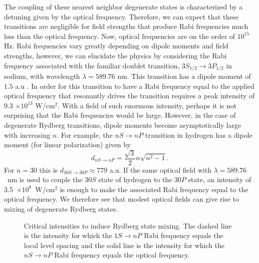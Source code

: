 The coupling of these nearest neighbor degenerate states is characterized by
a detuning given by the optical frequency.  Therefore, we can expect that
these transitions are negligible for field strengths that produce Rabi
frequencies much less than the optical frequency.  Now, optical frequencies
are on the order of $10^{15}$ Hz.  Rabi frequencies vary greatly depending
on dipole moments and field strengths, however, we can elucidate the physics
by considering the Rabi frequency associated with the familiar doublet
transition, $3S_{1/2} \rightarrow 3P_{1/2}$ in sodium, with wavelength
$\lambda = 589.76$ nm.  This transition has a dipole moment of $1.5$ a.u
\cite{Wiese:69}.  In order for this transition to have a Rabi frequency
equal to the applied optical frequency that resonantly drives the transition
requires a peak intensity of 9.3 $\times 10^{13}$ W/cm$^2$.  With a field of
such enormous intensity, perhaps it is not surprising that the Rabi
frequencies would be large.  However, in the case of degenerate Rydberg
transitions, dipole moments become asymptotically large with
increasing $n$.  For example, the $nS
\rightarrow nP$ transition in hydrogen has a dipole moment (for linear
polarization) given by
\begin{equation}
d_{nS \rightarrow nP} = \frac{\sqrt{3}}{2} n \sqrt{n^2 -1}.
\label{dnSnP}
\end{equation}
For $n = 30$ this is  $d_{30S \rightarrow 30P} \approx 779$ a.u.
If the same optical field with $\lambda = 589.76$~nm is used to couple the
$30S$ state of hydrogen to the $30P$ state, an intensity of 3.5~$\times
10^8$~W/cm$^2$ is enough to make the associated Rabi frequency equal to the
optical frequency.  We therefore see that modest optical fields can give rise
to mixing of degenerate Rydberg states.

\begin{figure}[tbp]
\bigskip
{} {Critical
intensities to induce Rydberg state mixing. The dashed line is the intensity
for which the $1S \rightarrow nP$ Rabi frequency equals the local level spacing
and the solid line is the intensity for which the $nS \rightarrow nP$ Rabi
frequency equals the optical frequency.
\label{inten}}
\end{figure}

